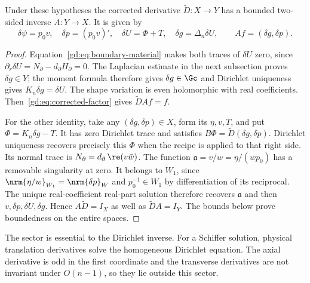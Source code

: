 \begin{proposition}\label{gd:prop:coupled}
Under these hypotheses the corrected derivative
$\widetilde D:X\to Y$ has a bounded two-sided inverse $A:Y\to X$.
It is given by
\begin{equation}\label{gd:eq:coupled-recipe}
 \delta\psi=p_0v,\quad \delta p=(p_0v)',\quad
 \delta U=\Phi+T,\quad \delta g=\Delta_n\delta U,\qquad
 Af=(\delta g,\delta p).
\end{equation}
\end{proposition}
\begin{proof}
Equation~\eqref{gd:eq:boundary-material} makes both traces of
$\delta U$ zero, since $\partial_r\delta U=N_\partial-d_\partial H_\partial=0$.
The Laplacian estimate in the next subsection proves
$\delta g\in Y$; the moment formula therefore gives
$\delta g\in\Gc$ and Dirichlet uniqueness gives
$K_n\delta g=\delta U$. The shape variation is even holomorphic
with real coefficients.
Then~\eqref{gd:eq:corrected-factor} gives $\widetilde D Af=f$.

For the other identity, take any $(\delta g,\delta p)\in X$,
form its $\eta,v,T$, and put $\Phi=K_n\delta g-T$.
It has zero Dirichlet trace and satisfies
$B\Phi=\widetilde D(\delta g,\delta p)$.
Dirichlet uniqueness recovers precisely this $\Phi$ when the recipe is
applied to that right side.
Its normal trace is $N_\partial=d_\partial\,\re(v\bar w)$.
The function $\mathfrak a=v/w=\eta/(wp_0)$ has a removable singularity at zero.
It belongs to $W_1$, since
$\nrm{\eta/w}_{W_1}=\nrm{\delta p}_W$ and
$p_0^{-1}\in W_1$ by differentiation of its reciprocal.
The unique real-coefficient real-part solution therefore recovers
$\mathfrak a$ and then $v,\delta p,\delta U,\delta g$.
Hence $A\widetilde D=I_X$ as well as $\widetilde DA=I_Y$.
The bounds below prove boundedness on the entire spaces.
\end{proof}

The sector is essential to the Dirichlet inverse.
For a Schiffer solution, physical translation derivatives solve the
homogeneous Dirichlet equation. The axial derivative is odd in the
first coordinate and the transverse derivatives are not invariant
under $O(n-1)$, so they lie outside this sector.

